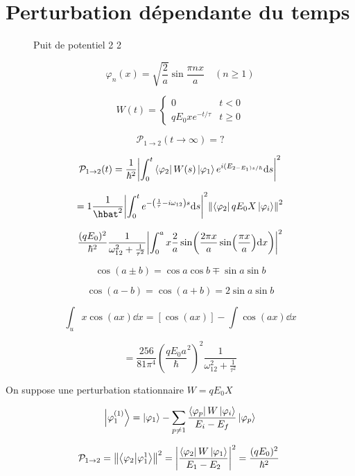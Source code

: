 



\section{Perturbation dépendante du temps}

\begin{figure}[ht]
    \centering
    \caption{Puit de potentiel 2 2}
    \label{fig:puit-de-potentiel-2-2}
\end{figure}


$$\varphi_n (x) = \sqrt{\frac{2}{a} } \sin \frac{\pi{}nx}{a} \quad (n \geq 1)$$ 

$$W(t) = \begin{cases}
	0 & t<0\\
	qE_0 x e^{-t/\tau} & t \geq 0
\end{cases}$$ 

$$\mathcal{P}_{1\to2} (t\to \infty) = ? $$ 

$$\mathcal{P}_{1\to2} (t) = \frac{1}{\hbar^2} \abs{\int_0^t \bra{\varphi_{{2}}} W(s) \ket{\varphi_{1}} e^{i(E_{2-E_1)s/\hbar}} \dd s}^2 $$ 

$$= 1 \frac{1}{\hbat^2} \abs{\int_0^t e^{-\left( \frac{1}{\tau} - i\omega_{12}  \right) s} \dd s}^2 \norm{\bra{\varphi_2}qE_0X\ket{\varphi_i}}^2  $$ 

$$\frac{(qE_0)^2}{\hbar^2} \frac{1}{\omega_{12}^2 + \frac{1}{\tau^2} } \abs{\int_0^a x \frac{2}{a} \sin(\frac{2\pi{}x}{a} \sin( \frac{\pi{}x}{a} ) \dd x)}^2  $$ 

$$\cos(a \pm b) = \cos a\cos b \mp \sin a \sin b$$ 

$$\cos (a-b) = \cos(a+b) = 2\sin a \sin b$$ 

$$\int_u x \cos(ax) \dd x = [\cos(ax)] - \int\cos(ax) \dd x$$ 


$$= \frac{256}{81\pi^4} \left( \frac{q E_0 a}{\hbar}^2 \right)^2 \frac{1}{\omega_{12}^2+\frac{1}{\tau^2}}  $$ 


On suppose une perturbation stationnaire $W= qE_0 X$ 

$$\ket{\varphi_1^{(1)}} = \ket{\varphi_{1}} - \sum_{p\neq 1} \frac{\bra{\varphi_p}W\ket{\varphi_i}}{E_i-E_f} \ket{\varphi_p} $$ 

$$\mathcal{P}_{1\to2} = \norm{\braket{\varphi_{2}}{\varphi_1^{1}}}^2 = \abs{\frac{\bra{\varphi_2}W\ket{\varphi_1}}{E_1 -E_{2}}}^2 = \frac{(qE_{0})^2}{\hbar^2} \frac{}{}$$ 



